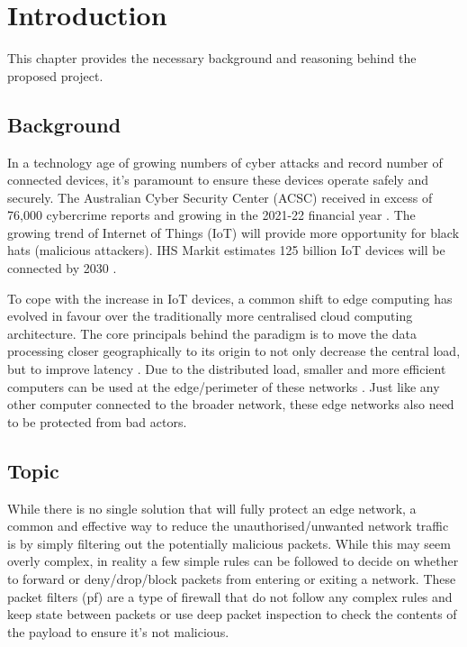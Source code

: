 \chapter[Introduction]{Introduction}
\label{Chap:Intro}




This chapter provides the necessary background and reasoning behind the proposed project. 

\section{Background }


In a technology age of growing numbers of cyber attacks and record number of connected devices, it's 
paramount to ensure these devices operate safely and securely. The Australian Cyber Security Center (ACSC) received in 
excess of 76,000 cybercrime reports and growing in the 2021-22 financial year \cite{acsc_2022}. The growing trend of Internet of Things (IoT) will provide 
more opportunity for black hats (malicious attackers). IHS Markit estimates 125 billion IoT devices will be connected by 2030 \cite{IHS_iot}. 

To cope with the increase in IoT devices, a common shift to edge computing has evolved in favour over the traditionally more centralised cloud computing 
architecture. The core principals behind the paradigm is to move the data processing closer geographically to its origin to not only decrease the 
central load, but to improve latency \cite{EdgeComputingPerspectives}. Due to the distributed load, smaller and more efficient computers can be used 
at the edge/perimeter of these networks \cite{EdgeComputingPerspectives}. Just like any other computer connected to the broader network, these 
edge networks also need to be protected from bad actors.



\section{Topic}

While there is no single solution that will fully protect an edge network, a common and effective way to reduce the unauthorised/unwanted network 
traffic is by simply filtering out the potentially malicious packets. While this may seem overly complex, in reality a few simple rules can be followed
to decide on whether to forward or deny/drop/block packets from entering or exiting a network. These packet filters (pf) are a type of firewall that do 
not follow any complex rules and keep state between packets or use deep packet inspection to check the contents of the payload to ensure it's not 
malicious. 

